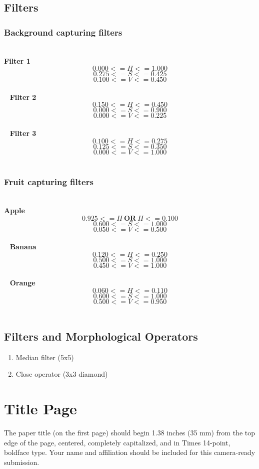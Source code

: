 \documentclass{article}
\begin{document}
\subsection{Filters}
\label{subsec:process:filters}
\subsubsection{Background capturing filters}
\label{subsubsec:process:filters:background}
~\\
\textbf{Filter 1}
\[0.000 <= H <= 1.000\]
\[0.275 <= S <= 0.425\]
\[0.100 <= V <= 0.450\]\\
~
\textbf{Filter 2}
\[0.150 <= H <= 0.450\]
\[0.000 <= S <= 0.900\]
\[0.000 <= V <= 0.225\]\\
~
\textbf{Filter 3}
\[0.100 <= H <= 0.275\]
\[0.125 <= S <= 0.350\]
\[0.000 <= V <= 1.000\]\\

\subsubsection{Fruit capturing filters}
\label{subsubsec:process:filters:fruit}
~\\
\textbf{Apple}
\[0.925 <= H\ \textbf{OR}\ H <= 0.100\]
\[0.600 <= S <= 1.000\]
\[0.050 <= V <= 0.500\]\\
~
\textbf{Banana}
\[0.120 <= H <= 0.250\]
\[0.500 <= S <= 1.000\]
\[0.450 <= V <= 1.000\]\\
~
\textbf{Orange}
\[0.060 <= H <= 0.110\]
\[0.600 <= S <= 1.000\]
\[0.500 <= V <= 0.950\]\\

\subsection{Filters and Morphological Operators}
\label{subsec:process:filtmorph}
\begin{enumerate}
\item Median filter (5x5)
\item Close operator (3x3 diamond)
\end{enumerate}

\section{Title Page}
\label{sec:pagestyle}

The paper title (on the first page) should begin 1.38 inches (35 mm)
from the top edge of the page, centered, completely capitalized, and
in Times 14-point, boldface type. Your name and affiliation should
be included for this camera-ready submission.
\end{document}
